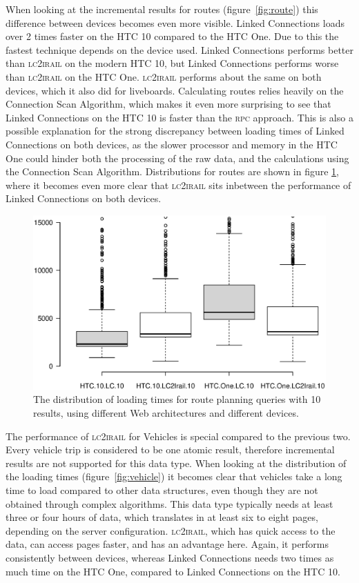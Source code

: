 \documentclass[twocolumn]{phdsymp} %
\begin{document}
When looking at the incremental results for routes (figure~\ref{fig:route}) this difference between devices becomes even more visible. Linked Connections loads over 2 times
faster on the HTC 10 compared to the HTC One. Due to this the fastest technique depends on the device used. Linked Connections performs better than \textsc{lc2irail} on the modern HTC 10, but Linked Connections performs worse than \textsc{lc2irail} on the HTC One. \textsc{lc2irail} performs about the same on both devices, which it also did for liveboards. Calculating routes relies heavily on the Connection Scan Algorithm, which makes it even more surprising to see that Linked Connections on the HTC 10 is faster than the \textsc{rpc} approach. This is also a possible explanation for the strong discrepancy between loading times of Linked Connections on both devices, as the slower processor and memory in the HTC One could hinder both the processing of the raw data, and the calculations using the Connection Scan Algorithm. Distributions for routes are shown in figure \ref{fig:routebox}, where it becomes even more clear that \textsc{lc2irail} sits inbetween the performance of Linked Connections on both devices.

\begin{figure}[ht]
	\begin{center}
		\includegraphics[trim=3cm 4cm 0 0, width=.50\textwidth]{images/boxplot_routes_10.eps}
		\caption{\label{fig:routebox} The distribution of loading times for route planning queries with 10 results, using different Web architectures and different devices. }
	\end{center}
\end{figure}

The performance of \textsc{lc2irail} for Vehicles is special compared to the previous two. Every vehicle trip is considered to be one atomic result, therefore incremental results are not supported for this data type. When looking at the distribution of the loading times (figure~\ref{fig:vehicle}) it becomes clear that vehicles take a long time to load compared to other data structures, even though they are not obtained through complex algorithms. This data type typically needs at least three or four hours of data, which translates in at least six to eight pages, depending on the server configuration. \textsc{lc2irail}, which has quick access to the data, can access pages faster, and has an advantage here. Again, it performs consistently between devices, whereas Linked Connections needs two times as much time on the HTC One, compared to Linked Connections on the HTC 10.
\end{document}
